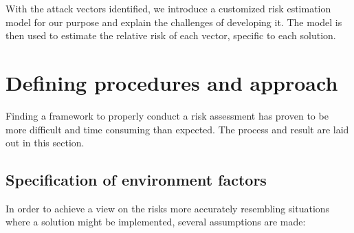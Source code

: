 With the attack vectors identified, we introduce a customized risk estimation model for our purpose and explain the challenges of developing it. The model is then used to estimate the relative risk of each vector, specific to each solution.

\section{Defining procedures and approach}
Finding a framework to properly conduct a risk assessment has proven to be more difficult and time consuming than expected. The process and result are laid out in this section.

\subsection{Specification of environment factors} \label{envDefine}
In order to achieve a view on the risks more accurately resembling situations where a solution might be implemented, several assumptions are made:


